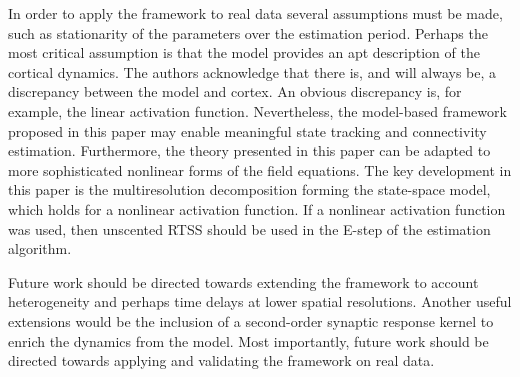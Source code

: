 \documentclass[journal,a4paper]{IEEEtran}
\begin{document}
In order to apply the framework to real data several assumptions must be made, such as stationarity of the parameters over the estimation period. Perhaps the most critical assumption is that the model provides an apt description of the cortical dynamics. The authors acknowledge that there is, and will always be, a discrepancy between the model and cortex. An obvious discrepancy is, for example, the linear activation function. Nevertheless, the model-based framework proposed in this paper may enable meaningful state tracking and connectivity estimation. Furthermore, the theory presented in this paper can be adapted to more sophisticated nonlinear forms of the field equations. The key development in this paper is the multiresolution decomposition forming the state-space model, which holds for a nonlinear activation function. If a nonlinear activation function was used, then unscented RTSS should be used in the E-step of the estimation algorithm. 

Future work should be directed towards extending the framework to account heterogeneity and perhaps time delays at lower spatial resolutions. Another useful extensions would be the inclusion of a second-order synaptic response kernel to enrich the dynamics from the model. Most importantly, future work should be directed towards applying and validating the framework on real data.





\ifCLASSOPTIONcaptionsoff
  \newpage
\fi

%  
% 


 
\end{document}
